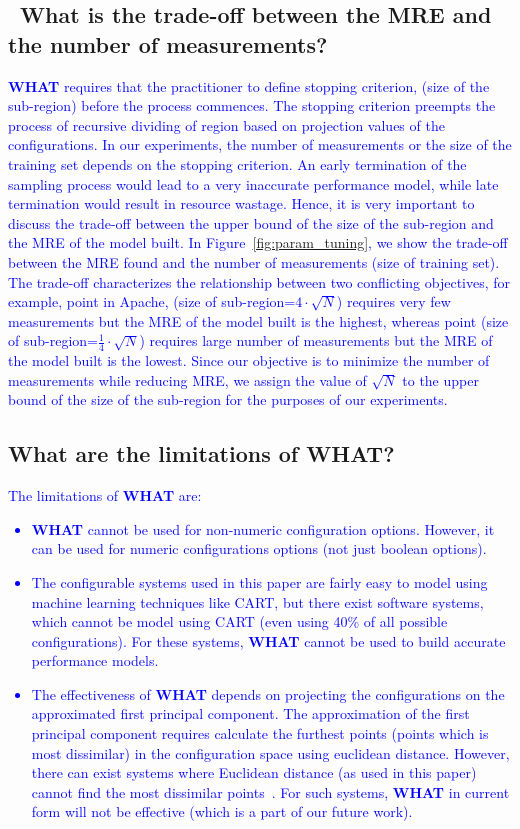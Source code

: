 \documentclass[smallextended]{svjour3}       %
\newcommand{\respto}[1]{
    \fcolorbox{black}{black!15}{
    \label{response:#1}
    \textbf{R-{#1}}}
}
\newcommand{\what}{{\bf WHAT}\xspace}
\begin{document}
\subsection{\respto{1b}~What is the trade-off between the MRE and the number of measurements?}
\textcolor{blue}{
\what{} requires that the practitioner to define stopping criterion, (size of the sub-region) before the
process commences.
The stopping criterion preempts the process of recursive dividing of region
based on projection values of the configurations. In our experiments, the
number of measurements or the size of the training set depends
on the stopping criterion. An early termination of the
sampling process would lead to a very inaccurate performance model, while
late termination would result in resource wastage. Hence, it is very
important to discuss the trade-off between the upper bound of the size of the sub-region and
the MRE of the model built. In Figure~\ref{fig:param_tuning}, we show the trade-off
between the MRE found and the number
of measurements (size of training set). The trade-off characterizes
the relationship between two conflicting objectives, for example,
point in Apache, (size of sub-region=$4\cdot \sqrt{N}$) requires very few measurements but the MRE of the model built is the highest, whereas point (size of sub-region=$\frac{1}{4}\cdot \sqrt{N}$) requires large
number of measurements but the MRE of the model built is the lowest. Since
our objective is to minimize the number of measurements while
reducing MRE, we assign the value of $\sqrt{N}$ to the upper bound of the size of the sub-region for the
purposes of our experiments.}

\subsection{\respto{2a}What are the limitations of WHAT?}

\textcolor{blue}{The limitations of \what{} are:
\begin{itemize}
    \item \what{} cannot be used for non-numeric configuration options. However, it can be used for numeric configurations options (not just boolean options). 
    \item The configurable systems used in this paper are fairly easy to model using machine learning techniques like CART, but there exist software systems, which cannot be model using CART (even using 40\% of all possible configurations). For these systems, \what{} cannot be used to build accurate performance models.
    \item The effectiveness of \what{} depends on projecting the configurations on the approximated first principal component. The approximation of the first principal component requires calculate the furthest points (points which is most dissimilar)  in the configuration space using euclidean distance. However, there can exist systems where  Euclidean distance (as used in this paper) cannot  find the most dissimilar points~\cite{chen2016sampling}. For such systems, \what{} in current form will not be effective (which is a part of our future work).
\end{itemize}
}
\end{document}

